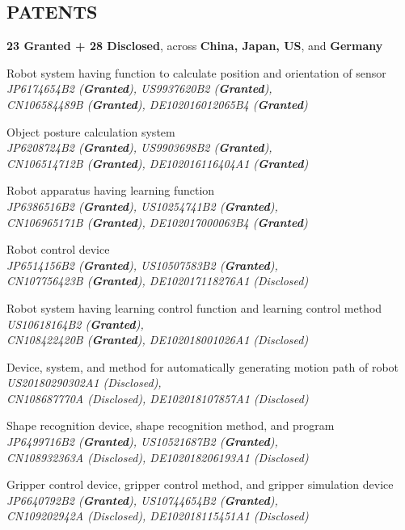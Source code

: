 \documentclass[UTF8,fontset=none]{res}
\begin{document}
\begin{resume}
\section{PATENTS}
\vspace{0.1in}
\textbf{23 Granted + 28 Disclosed}, across \textbf{China, Japan, US}, and \textbf{Germany}
\begin{etaremune}
	\item Robot system having function to calculate position and orientation of sensor {\it \\JP6174654B2 ({\bf Granted}), US9937620B2 ({\bf Granted}), \\CN106584489B ({\bf Granted}), DE102016012065B4 ({\bf Granted})}
	\item Object posture calculation system {\it \\JP6208724B2 ({\bf Granted}), US9903698B2 ({\bf Granted}), \\CN106514712B ({\bf Granted}), DE102016116404A1 ({\bf Granted})}
	\item Robot apparatus having learning function {\it \\JP6386516B2 ({\bf Granted}), US10254741B2 ({\bf Granted}), \\CN106965171B ({\bf Granted}), DE102017000063B4 ({\bf Granted})}
	\item Robot control device {\it \\JP6514156B2 ({\bf Granted}), US10507583B2 ({\bf Granted}), \\CN107756423B ({\bf Granted}), DE102017118276A1 (Disclosed)}
	\item Robot system having learning control function and learning control method {\it \\US10618164B2 ({\bf Granted}), \\CN108422420B ({\bf Granted}), DE102018001026A1 (Disclosed)}%
	\item Device, system, and method for automatically generating motion path of robot {\it \\US20180290302A1 (Disclosed),\\CN108687770A (Disclosed), DE102018107857A1 (Disclosed)}%
	\item Shape recognition device, shape recognition method, and program {\it \\JP6499716B2 ({\bf Granted}), US10521687B2 ({\bf Granted}),\\CN108932363A (Disclosed), DE102018206193A1 (Disclosed)}
	\item Gripper control device, gripper control method, and gripper simulation device {\it \\JP6640792B2 ({\bf Granted}), US10744654B2 ({\bf Granted}),\\CN109202942A (Disclosed), DE102018115451A1 (Disclosed)}

\end{etaremune}
\end{resume}
\end{document}
